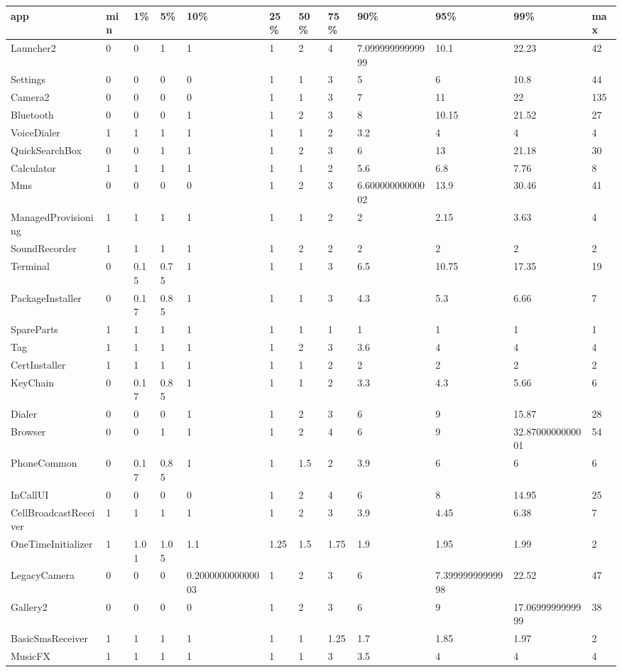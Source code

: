 \documentclass[a4paper]{article}
\begin{document}
\begin{tabular}{|l|l|l|l|l|l|l|l|l|l|l|l|}
\hline
app&min&1\%&5\%&10\%&25\%&50\%&75\%&90\%&95\%&99\%&max\\
\hline
Launcher2&0&0&1&1&1&2&4&7.09999999999999&10.1&22.23&42\\
\hline
Settings&0&0&0&0&1&1&3&5&6&10.8&44\\
\hline
Camera2&0&0&0&0&1&1&3&7&11&22&135\\
\hline
Bluetooth&0&0&0&1&1&2&3&8&10.15&21.52&27\\
\hline
VoiceDialer&1&1&1&1&1&1&2&3.2&4&4&4\\
\hline
QuickSearchBox&0&0&1&1&1&2&3&6&13&21.18&30\\
\hline
Calculator&1&1&1&1&1&1&2&5.6&6.8&7.76&8\\
\hline
Mms&0&0&0&0&1&2&3&6.60000000000002&13.9&30.46&41\\
\hline
ManagedProvisioning&1&1&1&1&1&1&2&2&2.15&3.63&4\\
\hline
SoundRecorder&1&1&1&1&1&2&2&2&2&2&2\\
\hline
Terminal&0&0.15&0.75&1&1&1&3&6.5&10.75&17.35&19\\
\hline
PackageInstaller&0&0.17&0.85&1&1&1&3&4.3&5.3&6.66&7\\
\hline
SpareParts&1&1&1&1&1&1&1&1&1&1&1\\
\hline
Tag&1&1&1&1&1&2&3&3.6&4&4&4\\
\hline
CertInstaller&1&1&1&1&1&1&2&2&2&2&2\\
\hline
KeyChain&0&0.17&0.85&1&1&1&2&3.3&4.3&5.66&6\\
\hline
Dialer&0&0&0&1&1&2&3&6&9&15.87&28\\
\hline
Browser&0&0&1&1&1&2&4&6&9&32.8700000000001&54\\
\hline
PhoneCommon&0&0.17&0.85&1&1&1.5&2&3.9&6&6&6\\
\hline
InCallUI&0&0&0&0&1&2&4&6&8&14.95&25\\
\hline
CellBroadcastReceiver&1&1&1&1&1&2&3&3.9&4.45&6.38&7\\
\hline
OneTimeInitializer&1&1.01&1.05&1.1&1.25&1.5&1.75&1.9&1.95&1.99&2\\
\hline
LegacyCamera&0&0&0&0.200000000000003&1&2&3&6&7.39999999999998&22.52&47\\
\hline
Gallery2&0&0&0&0&1&2&3&6&9&17.0699999999999&38\\
\hline
BasicSmsReceiver&1&1&1&1&1&1&1.25&1.7&1.85&1.97&2\\
\hline
MusicFX&1&1&1&1&1&1&3&3.5&4&4&4\\
\hline

\end{tabular}
\end{document}
